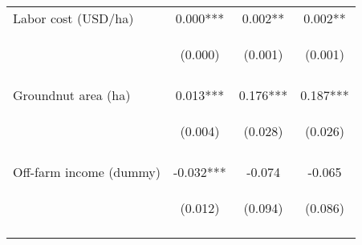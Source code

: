 \begin{center}
\begin{tabular}{lccc}
Labor cost (USD/ha) & 0.000*** & 0.002** & 0.002** \\
 & \begin{footnotesize}(0.000)\end{footnotesize} & \begin{footnotesize}(0.001)\end{footnotesize} & \begin{footnotesize}(0.001)\end{footnotesize} \\
\vspace{4pt} & \begin{footnotesize}[0.000]\end{footnotesize} & \begin{footnotesize}[0.031]\end{footnotesize} & \begin{footnotesize}[0.026]\end{footnotesize} \\
Groundnut area (ha) & 0.013*** & 0.176*** & 0.187*** \\
 & \begin{footnotesize}(0.004)\end{footnotesize} & \begin{footnotesize}(0.028)\end{footnotesize} & \begin{footnotesize}(0.026)\end{footnotesize} \\
\vspace{4pt} & \begin{footnotesize}[0.000]\end{footnotesize} & \begin{footnotesize}[0.000]\end{footnotesize} & \begin{footnotesize}[0.000]\end{footnotesize} \\
Off-farm income (dummy) & -0.032*** & -0.074 & -0.065 \\
 & \begin{footnotesize}(0.012)\end{footnotesize} & \begin{footnotesize}(0.094)\end{footnotesize} & \begin{footnotesize}(0.086)\end{footnotesize} \\
\vspace{4pt} & \begin{footnotesize}[0.008]\end{footnotesize} & \begin{footnotesize}[0.431]\end{footnotesize} & \begin{footnotesize}[0.448]\end{footnotesize} \\

\end{tabular}
\end{center}
